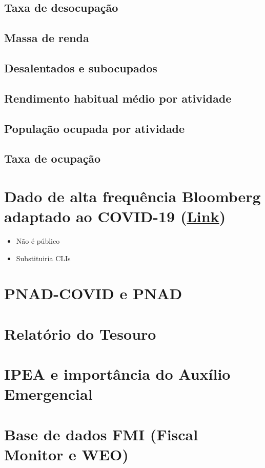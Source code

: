 \documentclass{SelfArx}
\begin{document}
\subsection*{Taxa de desocupação}
\label{sec:orgc1a3f5b}


\subsection*{Massa de renda}
\label{sec:orgd9c071f}


\subsection*{Desalentados e subocupados}
\label{sec:org1ab6c79}

\subsection*{Rendimento habitual médio por atividade}
\label{sec:org2c3b2ab}

\subsection*{População ocupada por atividade}
\label{sec:org9468294}



\subsection*{Taxa de ocupação}
\label{sec:org3f9f675}


\section*{Dado de alta frequência Bloomberg adaptado ao COVID-19 (\href{https://www.bloomberg.com/news/articles/2020-11-13/alternative-data-show-activity-crashes-as-virus-resurges-chart}{Link})}
\label{sec:orgc078ce8}

\begin{itemize}
\item Não é público
\item Substituiria CLIs
\end{itemize}

\section*{PNAD-COVID e PNAD}
\label{sec:org6ed3a14}



\section*{Relatório do Tesouro}
\label{sec:orgb2d7d12}

\section*{IPEA e importância do Auxílio Emergencial}
\label{sec:orgfc5e240}

\section*{Base de dados FMI (Fiscal Monitor e WEO)}
\label{sec:org5378a15}
\end{document}
